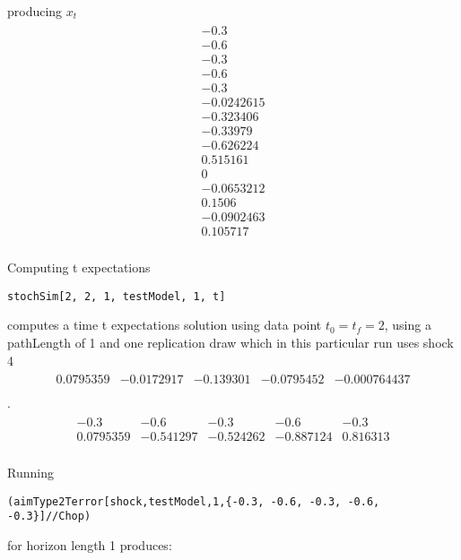 producing $x_t$
\begin{gather*}\begin{array}{c}
 -0.3 \\
 -0.6 \\
 -0.3 \\
 -0.6 \\
 -0.3 \\
 -0.0242615 \\
 -0.323406 \\
 -0.33979 \\
 -0.626224 \\
 0.515161 \\
 0 \\
 -0.0653212 \\
 0.1506 \\
 -0.0902463 \\
 0.105717 \\
\end{array}
\end{gather*}



Computing t expectations 


\begin{verbatim}
stochSim[2, 2, 1, testModel, 1, t]
\end{verbatim}
computes a time t expectations solution  using data point $t_0=t_f=2$, using a pathLength of 1 and one replication draw 
which in this particular run uses
shock {4}
\begin{gather*}\begin{array}{ccccc}
 0.0795359 & -0.0172917 & -0.139301 & -0.0795452 & -0.000764437 \\
\end{array}
\end{gather*}
.
\begin{gather*}\begin{array}{ccccc}
 -0.3 & -0.6 & -0.3 & -0.6 & -0.3 \\
 0.0795359 & -0.541297 & -0.524262 & -0.887124 & 0.816313 \\
\end{array}
\end{gather*}







Running 
\begin{verbatim}
(aimType2Terror[shock,testModel,1,{-0.3, -0.6, -0.3, -0.6, -0.3}]//Chop)
\end{verbatim}
for horizon length 1 produces:





